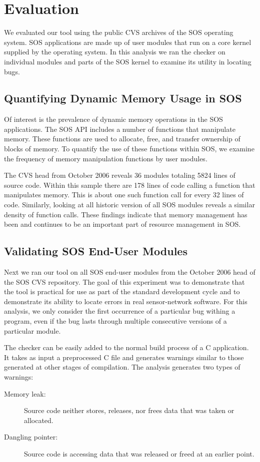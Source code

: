 \section{Evaluation}
\label{sec:eval}

We evaluated our tool using the public CVS archives of the SOS
operating system.  SOS applications are made up of user modules that
run on a core kernel supplied by the operating system.  In this
analysis we ran the checker on individual modules and parts of the SOS
kernel to examine its utility in locating bugs.  

\subsection{Quantifying Dynamic Memory Usage in SOS}

Of interest is the prevalence of dynamic memory operations in the SOS
applications.  The SOS API includes a number of functions that
manipulate memory.  These functions are used to allocate, free, and
transfer ownership of blocks of memory.  To quantify the use of these
functions within SOS, we examine the frequency of memory
manipulation functions by user modules. 

The CVS head from October 2006 reveals 36 modules totaling 5824 lines
of source code.  Within this sample there are 178 lines of code
calling a function that manipulates memory.  This is about one such
function call for every 32 lines of code.  Similarly, looking at all
historic version of all SOS modules reveals a similar density of
function calls.  These findings indicate that memory management has
been and continues to be an important part of resource management in
SOS.


\subsection{Validating SOS End-User Modules}

Next we ran our tool on all SOS end-user modules from the October 2006
head of the SOS CVS repository.  The goal of this experiment was to
demonstrate that the tool is practical for use as part of the standard
development cycle and to demonstrate its ability to locate errors in
real sensor-network software.  For this analysis, we only consider the
first occurrence of a particular bug withing a program, even if the bug
lasts through multiple consecutive versions of a particular module.


The checker can be easily added to the normal build process of a C
application.  It takes as input a preprocessed C file and generates
warnings similar to those generated at other stages of compilation.
The analysis generates two types of warnings:
%
\begin{description}
%
\item[Memory leak:] Source code neither stores, releases, nor frees
data that was taken or allocated.
%
\item[Dangling pointer:] Source code is accessing data that was
released or freed at an earlier point.
%
\end{description}


